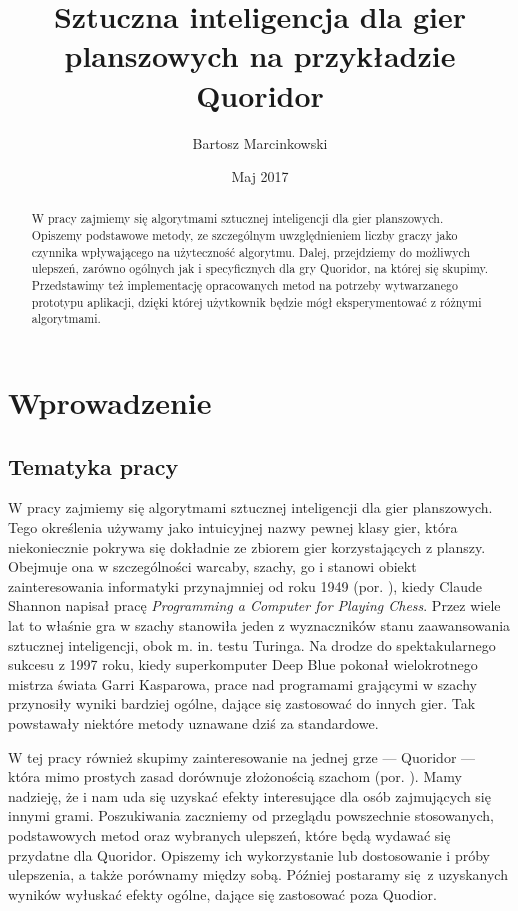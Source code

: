 \documentclass{pracamgr}
\author{Bartosz Marcinkowski}
\title{Sztuczna inteligencja dla gier planszowych na przykładzie Quoridor}
\date{Maj 2017}
\begin{document}
\maketitle

\begin{abstract}
W pracy zajmiemy się algorytmami sztucznej inteligencji dla gier planszowych.
Opiszemy podstawowe metody, ze szczególnym uwzględnieniem liczby graczy jako czynnika wpływającego na użyteczność algorytmu.
Dalej, przejdziemy do możliwych ulepszeń, zarówno ogólnych jak i specyficznych dla gry Quoridor, na której się skupimy.
Przedstawimy też implementację opracowanych metod na potrzeby wytwarzanego prototypu aplikacji, dzięki której użytkownik będzie mógł eksperymentować z różnymi algorytmami.
\end{abstract}

\tableofcontents


\chapter{Wprowadzenie}

\section{Tematyka pracy}

W pracy zajmiemy się algorytmami sztucznej inteligencji dla gier planszowych.
Tego określenia używamy jako intuicyjnej nazwy pewnej klasy gier, która niekoniecznie pokrywa się dokładnie ze zbiorem gier korzystających z planszy.
Obejmuje ona w szczególności warcaby, szachy, go i stanowi obiekt zainteresowania informatyki przynajmniej od roku 1949 (por. \cite{anderson}), kiedy Claude Shannon napisał pracę \textit{Programming a Computer for Playing Chess}.
Przez wiele lat to właśnie gra w szachy stanowiła jeden z wyznaczników stanu zaawansowania sztucznej inteligencji, obok m. in. testu Turinga.
Na drodze do spektakularnego sukcesu z 1997 roku, kiedy superkomputer Deep Blue pokonał wielokrotnego mistrza świata Garri Kasparowa, prace nad programami grającymi w szachy przynosiły wyniki bardziej ogólne, dające się zastosować do innych gier.
Tak powstawały niektóre metody uznawane dziś za standardowe.

W tej pracy również skupimy zainteresowanie na jednej grze --- Quoridor --- która mimo prostych zasad dorównuje złożonością szachom (por. \cite{mertens}).
Mamy nadzieję, że i nam uda się uzyskać efekty interesujące dla osób zajmujących się innymi grami.
Poszukiwania zaczniemy od przeglądu powszechnie stosowanych, podstawowych metod oraz wybranych ulepszeń, które będą wydawać się przydatne dla Quoridor.
Opiszemy ich wykorzystanie lub dostosowanie i próby ulepszenia, a także porównamy między sobą.
Później postaramy się z uzyskanych wyników wyłuskać efekty ogólne, dające się zastosować poza Quodior.
\end{document}
